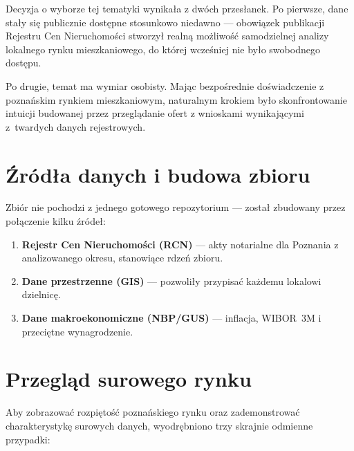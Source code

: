 \documentclass[12pt,a4paper]{article}
\begin{document}
Decyzja o wyborze tej tematyki wynikała z dwóch przesłanek.
Po pierwsze, dane stały się publicznie dostępne stosunkowo niedawno --- obowiązek publikacji Rejestru Cen Nieruchomości stworzył realną możliwość samodzielnej analizy lokalnego rynku mieszkaniowego, do której wcześniej nie było swobodnego dostępu.

Po drugie, temat ma wymiar osobisty. Mając bezpośrednie doświadczenie z poznańskim rynkiem mieszkaniowym, naturalnym krokiem było skonfrontowanie intuicji budowanej przez przeglądanie ofert z wnioskami wynikającymi z~twardych danych rejestrowych.

\section{Źródła danych i budowa zbioru}

Zbiór nie pochodzi z jednego gotowego repozytorium --- został zbudowany przez połączenie kilku źródeł:

\begin{enumerate}
  \item \textbf{Rejestr Cen Nieruchomości (RCN)} --- akty notarialne dla Poznania z analizowanego okresu, stanowiące rdzeń zbioru.
  \item \textbf{Dane przestrzenne (GIS)} --- pozwoliły przypisać każdemu lokalowi dzielnicę.
  \item \textbf{Dane makroekonomiczne (NBP/GUS)} --- inflacja, WIBOR~3M i przeciętne wynagrodzenie.
\end{enumerate}

\section{Przegląd surowego rynku}

Aby zobrazować rozpiętość poznańskiego rynku oraz zademonstrować charakterystykę surowych danych, wyodrębniono trzy skrajnie odmienne przypadki:
\end{document}
